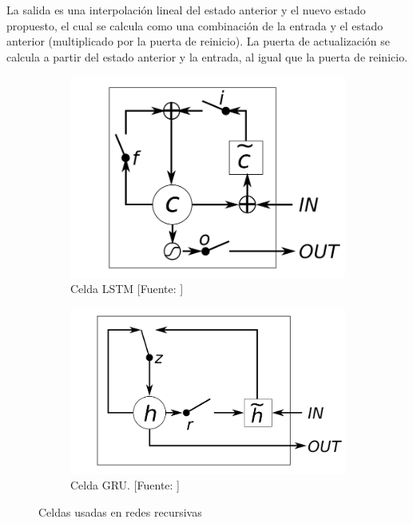 La salida es una interpolación lineal del estado anterior y el nuevo estado propuesto, el cual se calcula como una combinación de la entrada y el estado anterior (multiplicado por la puerta de reinicio). La puerta de actualización se calcula a partir del estado anterior y la entrada, al igual que la puerta de reinicio.

\begin{figure}
	\begin{subfigure}[b]{0.5\textwidth}
		\centering
		\includegraphics[width=\linewidth]{imagenes/metodos/lstm.png}
		\caption{Celda LSTM [Fuente: \cite{chung2014empirical}]}
		\label{fig:metodos/lstm}
	\end{subfigure}
	\begin{subfigure}[b]{0.5\textwidth}
		\centering
		\includegraphics[width=\linewidth]{imagenes/metodos/gru.png}
		\caption{Celda GRU. [Fuente: \cite{chung2014empirical}]}
		\label{fig:metodos/gru}
	\end{subfigure}
	\caption{Celdas usadas en redes recursivas}
\end{figure}
